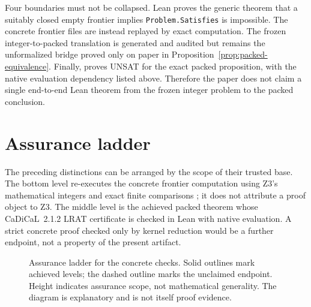 \documentclass[11pt,twoside]{article}
\theoremstyle{remark}
\begin{document}
\begin{trustboundary}
Four boundaries must not be collapsed.  Lean proves the generic theorem that
a suitably closed empty frontier implies \texttt{Problem.Satisfies} is
impossible.  The concrete frontier files are instead replayed by exact
computation.  The frozen integer-to-packed translation is generated and
audited but remains the unformalized bridge proved only on paper in
Proposition~\ref{prop:packed-equivalence}.  Finally, \PackedTheorem{} proves
UNSAT for the exact packed proposition, with the native evaluation dependency
listed above.  Therefore the paper does not claim a single end-to-end Lean
theorem from the frozen integer problem to the packed conclusion.
\end{trustboundary}

\section{Assurance ladder}
\label{sec:assurance-ladder}

The preceding distinctions can be arranged by the scope of their trusted
base.  The bottom level re-executes the concrete frontier computation using
Z3's mathematical integers and exact finite comparisons
\cite{z3Arithmetic}; it does not attribute a proof object to Z3.  The middle
level is the achieved packed theorem whose CaDiCaL~2.1.2 LRAT certificate is
checked in Lean with native evaluation.  A strict concrete proof checked only by
kernel reduction would be a further endpoint, not a property of the present
artifact.

\begin{figure}[H]
  \centering
  \caption{Assurance ladder for the concrete checks.  Solid outlines mark
  achieved levels; the dashed outline marks the unclaimed endpoint.  Height
  indicates assurance scope, not mathematical generality.  The diagram is
  explanatory and is not itself proof evidence.}
  \label{fig:assurance-ladder}
\end{figure}
\end{document}
